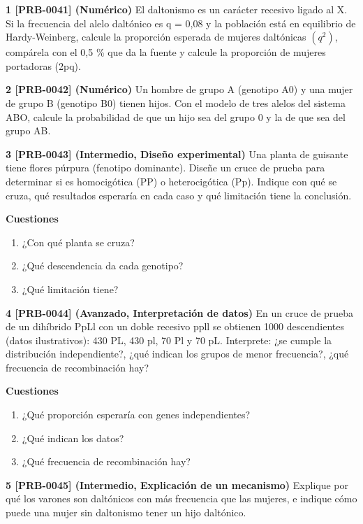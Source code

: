 \documentclass{book}
\begin{document}
\begin{tcolorbox}[title={Ejercicios}, studiumworked, breakable]

\noindent\textbf{1 [PRB-0041] (Numérico)}
El daltonismo es un carácter recesivo ligado al X. Si la frecuencia del alelo daltónico es q = 0,08 y la población está en equilibrio de Hardy-Weinberg, calcule la proporción esperada de mujeres daltónicas \((q^{2})\), compárela con el 0,5 \% que da la fuente y calcule la proporción de mujeres portadoras (2pq).


\noindent\textbf{2 [PRB-0042] (Numérico)}
Un hombre de grupo A (genotipo A0) y una mujer de grupo B (genotipo B0) tienen hijos. Con el modelo de tres alelos del sistema ABO, calcule la probabilidad de que un hijo sea del grupo 0 y la de que sea del grupo AB.


\noindent\textbf{3 [PRB-0043] (Intermedio, Diseño experimental)}
Una planta de guisante tiene flores púrpura (fenotipo dominante). Diseñe un cruce de prueba para determinar si es homocigótica (PP) o heterocigótica (Pp). Indique con qué se cruza, qué resultados esperaría en cada caso y qué limitación tiene la conclusión.


\noindent\textbf{Cuestiones}
\begin{enumerate}
\item ¿Con qué planta se cruza?
\item ¿Qué descendencia da cada genotipo?
\item ¿Qué limitación tiene?
\end{enumerate}

\noindent\textbf{4 [PRB-0044] (Avanzado, Interpretación de datos)}
En un cruce de prueba de un dihíbrido PpLl con un doble recesivo ppll se obtienen 1000 descendientes (datos ilustrativos): 430 PL, 430 pl, 70 Pl y 70 pL. Interprete: ¿se cumple la distribución independiente?, ¿qué indican los grupos de menor frecuencia?, ¿qué frecuencia de recombinación hay?


\noindent\textbf{Cuestiones}
\begin{enumerate}
\item ¿Qué proporción esperaría con genes independientes?
\item ¿Qué indican los datos?
\item ¿Qué frecuencia de recombinación hay?
\end{enumerate}

\noindent\textbf{5 [PRB-0045] (Intermedio, Explicación de un mecanismo)}
Explique por qué los varones son daltónicos con más frecuencia que las mujeres, e indique cómo puede una mujer sin daltonismo tener un hijo daltónico.



\end{tcolorbox}
\end{document}

